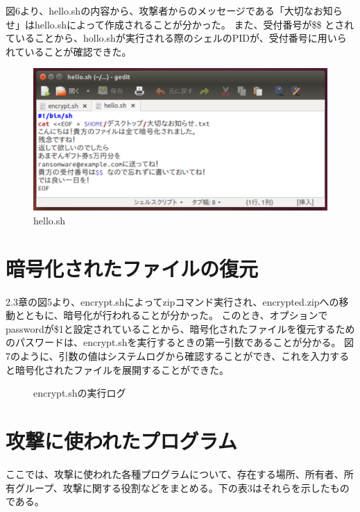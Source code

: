 \documentclass[dvipdfmx,autodetect-engine,titlepage]{jsarticle}
\begin{document}
図6より、hello.shの内容から、攻撃者からのメッセージである「大切なお知らせ」はhello.shによって作成されることが分かった。
また、受付番号が\$\$ とされていることから、hollo.shが実行される際のシェルのPIDが、受付番号に用いられていることが確認できた。\\
\begin{figure}[H]
  \centering
  \includegraphics[scale=0.45]{in8.png}
  \caption{hello.sh}\label{fig:図8}
\end{figure}

\section{暗号化されたファイルの復元}
2.3章の図5より、encrypt.shによってzipコマンド実行され、encrypted.zipへの移動とともに、暗号化が行われることが分かった。
このとき、オプションでpasswordが\$1と設定されていることから、暗号化されたファイルを復元するためのパスワードは、encrypt.shを実行するときの第一引数であることが分かる。
図7のように、引数の値はシステムログから確認することができ、これを入力すると暗号化されたファイルを展開することができた。\\
\begin{figure}[H]
  \centering
  \caption{encrypt.shの実行ログ}\label{fig:図9}
\end{figure}

\section{攻撃に使われたプログラム}
ここでは、攻撃に使われた各種プログラムについて、存在する場所、所有者、所有グループ、攻撃に関する役割などをまとめる。下の表3はそれらを示したものである。
\end{document}

